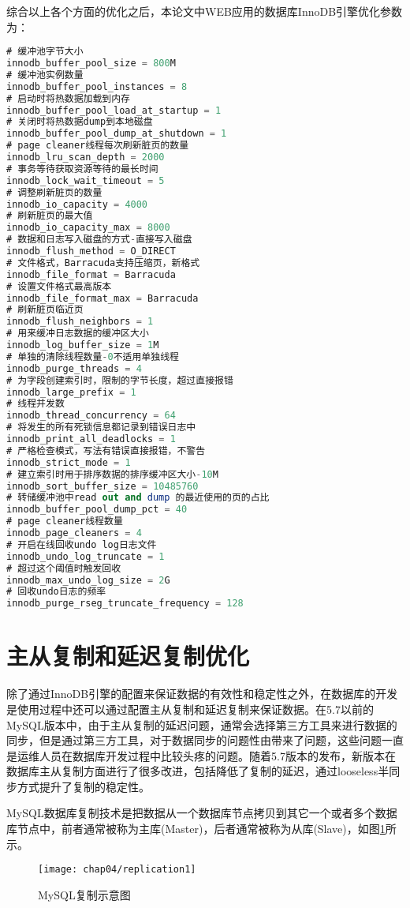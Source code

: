 综合以上各个方面的优化之后，本论文中WEB应用的数据库InnoDB引擎优化参数为：
\begin{lstlisting}[language=sql,numbers=none]
# 缓冲池字节大小
innodb_buffer_pool_size = 800M
# 缓冲池实例数量
innodb_buffer_pool_instances = 8
# 启动时将热数据加载到内存
innodb_buffer_pool_load_at_startup = 1
# 关闭时将热数据dump到本地磁盘
innodb_buffer_pool_dump_at_shutdown = 1
# page cleaner线程每次刷新脏页的数量
innodb_lru_scan_depth = 2000
# 事务等待获取资源等待的最长时间
innodb_lock_wait_timeout = 5
# 调整刷新脏页的数量
innodb_io_capacity = 4000
# 刷新脏页的最大值
innodb_io_capacity_max = 8000
# 数据和日志写入磁盘的方式-直接写入磁盘
innodb_flush_method = O_DIRECT
# 文件格式，Barracuda支持压缩页，新格式
innodb_file_format = Barracuda
# 设置文件格式最高版本
innodb_file_format_max = Barracuda
# 刷新脏页临近页
innodb_flush_neighbors = 1
# 用来缓冲日志数据的缓冲区大小
innodb_log_buffer_size = 1M
# 单独的清除线程数量-0不适用单独线程
innodb_purge_threads = 4
# 为字段创建索引时，限制的字节长度，超过直接报错
innodb_large_prefix = 1
# 线程并发数
innodb_thread_concurrency = 64
# 将发生的所有死锁信息都记录到错误日志中
innodb_print_all_deadlocks = 1
# 严格检查模式，写法有错误直接报错，不警告
innodb_strict_mode = 1
# 建立索引时用于排序数据的排序缓冲区大小-10M
innodb_sort_buffer_size = 10485760
# 转储缓冲池中read out and dump 的最近使用的页的占比
innodb_buffer_pool_dump_pct = 40
# page cleaner线程数量
innodb_page_cleaners = 4
# 开启在线回收undo log日志文件
innodb_undo_log_truncate = 1
# 超过这个阈值时触发回收
innodb_max_undo_log_size = 2G
# 回收undo日志的频率
innodb_purge_rseg_truncate_frequency = 128
\end{lstlisting}

\section{主从复制和延迟复制优化}
除了通过InnoDB引擎的配置来保证数据的有效性和稳定性之外，在数据库的开发是使用过程中还可以通过配置主从复制和延迟复制来保证数据。在5.7以前的MySQL版本中，由于主从复制的延迟问题，通常会选择第三方工具来进行数据的同步，但是通过第三方工具，对于数据同步的问题性由带来了问题，这些问题一直是运维人员在数据库开发过程中比较头疼的问题。随着5.7版本的发布，新版本在数据库主从复制方面进行了很多改进，包括降低了复制的延迟，通过looseless半同步方式提升了复制的稳定性\cite{朱振2013基于}。

MySQL数据库复制技术是把数据从一个数据库节点拷贝到其它一个或者多个数据库节点中，前者通常被称为主库(Master)，后者通常被称为从库(Slave)，如图\ref{fig:replication1}所示。
\begin{figure}[H] %
  \centering
  \texttt{[image: chap04/replication1]}
  \caption{MySQL复制示意图}
  \label{fig:replication1}
\end{figure}

